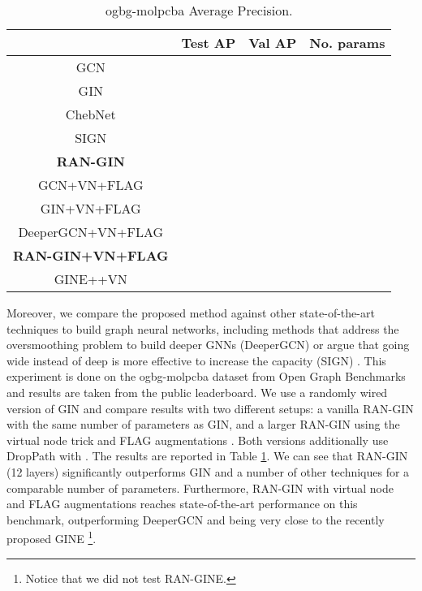 \documentclass[10pt,twocolumn,twoside]{IEEEtran}
\begin{document}
\begin{table}[t]
\centering
\caption{\textrm{ogbg-molpcba} Average Precision.} 
\label{table:molpcba}
\setlength\tabcolsep{2pt} 
\renewcommand{\arraystretch}{1.5}
\begin{tabular}{cccc}
                         & Test AP               & Val AP                & No. params  \\ \hline
GCN                      &  &  &    \\ \hline
GIN                      &  &  &  \\ \hline
ChebNet                  &  &  &  \\ \hline
SIGN                     &  &  &  \\ \hline
\textbf{RAN-GIN}         &  &  &  \\ \hline
GCN+VN+FLAG              &  &  &  \\ \hline
GIN+VN+FLAG              &  &  &  \\ \hline
DeeperGCN+VN+FLAG        &  &  &  \\ \hline
\textbf{RAN-GIN+VN+FLAG} &  &  &  \\ \hline
GINE++VN                 &  &  &  \\ \hline
\end{tabular}
\end{table}


Moreover, we compare the proposed method against other state-of-the-art techniques to build graph neural networks, including methods that address the oversmoothing problem to build deeper GNNs (DeeperGCN) \cite{li2020deepergcn} or argue that going wide instead of deep is more effective to increase the capacity (SIGN) \cite{rossi2020sign}. This experiment is done on the ogbg-molpcba dataset from Open Graph Benchmarks \cite{hu2020ogb} and results are taken from the public leaderboard. We use a randomly wired version of GIN and compare results with two different setups: a vanilla RAN-GIN with the same number of parameters as GIN, and a larger RAN-GIN using the virtual node trick \cite{gilmer2017neural} and FLAG augmentations \cite{kong2020flag}. Both versions additionally use DropPath with . The results are reported in Table \ref{table:molpcba}. We can see that RAN-GIN (12 layers) significantly outperforms GIN and a number of other techniques for a comparable number of parameters. Furthermore, RAN-GIN with virtual node and FLAG augmentations reaches state-of-the-art performance on this benchmark, outperforming DeeperGCN and being very close to the recently proposed GINE \cite{brossard2020graph}\footnote{Notice that we did not test RAN-GINE.}.
\end{document}
